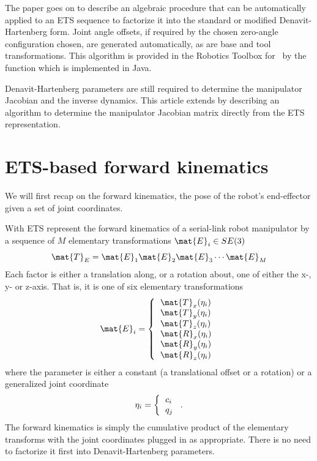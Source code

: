 \documentclass[11pt]{article}
\begin{document}
The paper\cite{Corke07a} goes on to describe an algebraic procedure that can be automatically applied to an ETS
sequence to factorize it into the standard or modified Denavit-Hartenberg
form.  Joint angle offsets, if required by the chosen zero-angle configuration 
chosen, are generated automatically, as are base and tool transformations.
This algorithm is provided in the Robotics Toolbox for \MATLAB\ by the function  which is implemented in Java.

Denavit-Hartenberg parameters are still required to determine the manipulator Jacobian and the inverse dynamics.
This article extends \cite{Corke07a} by describing an algorithm to determine the manipulator Jacobian matrix directly from the ETS
representation.

\section{ETS-based forward kinematics}
We will first recap on the forward kinematics, the pose of the robot's end-effector given a set of joint coordinates.

With ETS represent the forward kinematics of a serial-link  robot manipulator by a sequence of $M$ elementary transformations  $\mat{E}_i \in SE(3)$
\begin{equation}
\mat{T}_E = \mat{E}_1 \mat{E}_2 \mat{E}_3 \cdots \mat{E}_M \label{eq:fkine}
\end{equation}
Each factor is either a translation along, or a rotation about, one of either the x-, y- or z-axis.  That is, it is one of six elementary transformations
\[
\mat{E}_i = \left\{ \begin{tabular}{l}
$\mat{T}_x(\eta_i)$ \\
$\mat{T}_y(\eta_i)$ \\
$\mat{T}_z(\eta_i)$ \\
$\mat{R}_x(\eta_i)$ \\
$\mat{R}_y(\eta_i)$ \\
$\mat{R}_z(\eta_i)$ \end{tabular}
\right.
\]
where the parameter is
either a constant (a translational offset or a rotation) or a generalized joint coordinate
\[
\eta_i = \left\{ \begin{tabular}{l}
$c_i$ \\
$q_j$ \end{tabular}
\right.  .
\]
The forward kinematics is simply the cumulative product of the elementary transforms with the joint coordinates plugged in as
appropriate. There is no need to factorize it first into Denavit-Hartenberg parameters.
\end{document}
